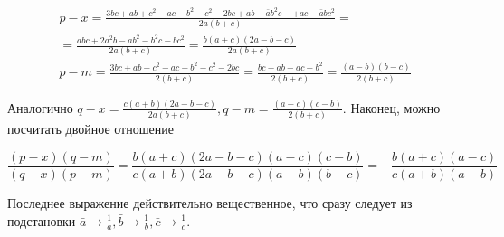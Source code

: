 $$
\begin{gathered}
p-x=\frac{3 b c+a b+c^2-a c-b^2-c^2-2 b c+a b-\bar{a} b^2 c-+a c-\bar{a} b c^2}{2 a(b+c)}= \\
=\frac{a b c+2 a^2 b-a b^2-b^2 c-b c^2}{2 a(b+c)}=\frac{b(a+c)(2 a-b-c)}{2 a(b+c)} \\
p-m=\frac{3 b c+a b+c^2-a c-b^2-c^2-2 b c}{2(b+c)}=\frac{b c+a b-a c-b^2}{2(b+c)}=\frac{(a-b)(b-c)}{2(b+c)}
\end{gathered}
$$


Аналогично $q-x=\frac{c(a+b)(2 a-b-c)}{2 a(b+c)}, q-m=\frac{(a-c)(c-b)}{2(b+c)}$. Наконец, можно посчитать двойное отношение

$$
\frac{(p-x)(q-m)}{(q-x)(p-m)}=\frac{b(a+c)(2 a-b-c)(a-c)(c-b)}{c(a+b)(2 a-b-c)(a-b)(b-c)}=-\frac{b(a+c)(a-c)}{c(a+b)(a-b)}
$$


Последнее выражение действительно вещественное, что сразу следует из подстановки $\bar{a} \rightarrow \frac{1}{a}, \bar{b} \rightarrow \frac{1}{b}, \bar{c} \rightarrow \frac{1}{c}$.

